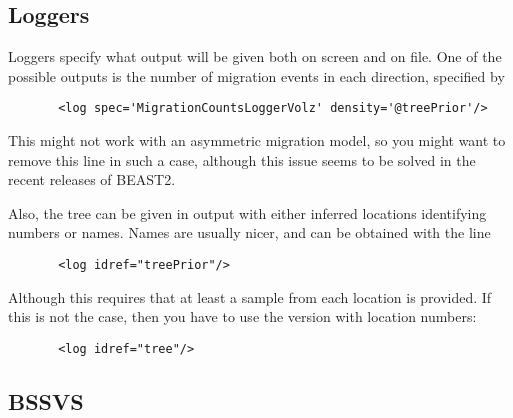 \documentclass[10pt,letterpaper]{article}
\begin{document}
\subsection{Loggers}

Loggers specify what output will be given both on screen and on file.
One of the possible outputs is the number of migration events in each direction, specified by 

\begin{lstlisting}
       <log spec='MigrationCountsLoggerVolz' density='@treePrior'/>
\end{lstlisting}

This might not work with an asymmetric migration model, so you might want to remove this line in such a case, although this issue seems to be solved in the recent releases of BEAST2.

Also, the tree can be given in output with either inferred locations identifying numbers or names.
Names are usually nicer, and can be obtained with the line

\begin{lstlisting}
       <log idref="treePrior"/>
\end{lstlisting}

Although this requires that at least a sample from each location is provided. If this is not the case, then you have to use the version with location numbers:

\begin{lstlisting}
       <log idref="tree"/>
\end{lstlisting}


\subsection{BSSVS}
\end{document}
